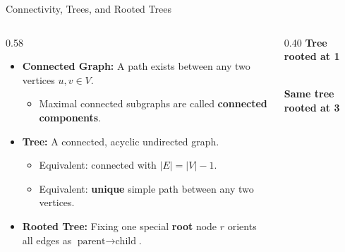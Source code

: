 \documentclass{beamer}
\begin{document}
\begin{frame}{Connectivity, Trees, and Rooted Trees}
  \begin{columns}[c]
    \begin{column}{0.58\textwidth}
      \begin{itemize}
        \item \textbf{Connected Graph:} A path exists between any two vertices $u, v \in V$.
          \begin{itemize}
            \item Maximal connected subgraphs are called \textbf{connected components}.
          \end{itemize}
        \item \textbf{Tree:} A connected, acyclic undirected graph.
          \begin{itemize}
            \item Equivalent: connected with $|E| = |V| - 1$.
            \item Equivalent: \textbf{unique} simple path between any two vertices.
          \end{itemize}
        \item \textbf{Rooted Tree:} Fixing one special \textbf{root} node $r$ orients all edges as $\text{parent} \to \text{child}$.
      \end{itemize}
    \end{column}
    \begin{column}{0.40\textwidth}
      \centering
      {\scriptsize\textbf{Tree rooted at 1}}\\[2pt]
      \\[6pt]
      {\scriptsize\textbf{Same tree rooted at 3}}\\[2pt]
    \end{column}
  \end{columns}
\end{frame}
\end{document}
